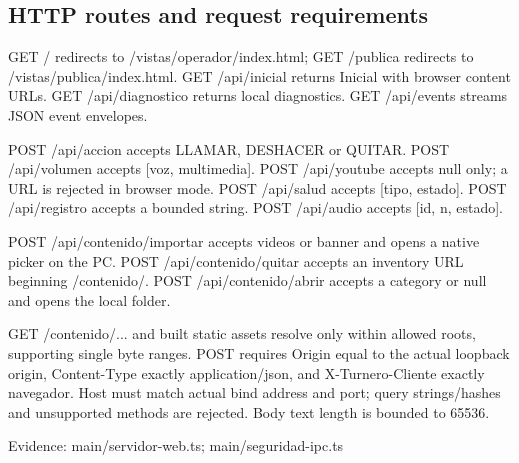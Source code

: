 \subsection{HTTP routes and request requirements}

GET / redirects to /vistas/operador/index.html; GET /publica redirects to /vistas/publica/index.html. GET /api/inicial returns Inicial with browser content URLs. GET /api/diagnostico returns local diagnostics. GET /api/events streams JSON event envelopes.

POST /api/accion accepts LLAMAR, DESHACER or QUITAR. POST /api/volumen accepts [voz, multimedia]. POST /api/youtube accepts null only; a URL is rejected in browser mode. POST /api/salud accepts [tipo, estado]. POST /api/registro accepts a bounded string. POST /api/audio accepts [id, n, estado].

POST /api/contenido/importar accepts videos or banner and opens a native picker on the PC. POST /api/contenido/quitar accepts an inventory URL beginning /contenido/. POST /api/contenido/abrir accepts a category or null and opens the local folder.

GET /contenido/... and built static assets resolve only within allowed roots, supporting single byte ranges. POST requires Origin equal to the actual loopback origin, Content-Type exactly application/json, and X-Turnero-Cliente exactly navegador. Host must match actual bind address and port; query strings/hashes and unsupported methods are rejected. Body text length is bounded to 65536.

Evidence: main/servidor-web.ts; main/seguridad-ipc.ts
